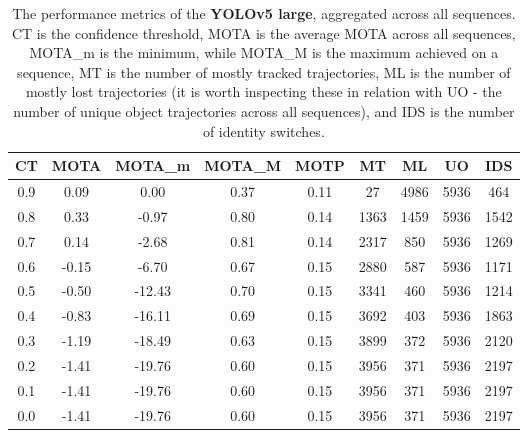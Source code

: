 \begin{table}[h]
    \centering
    \begin{tabular}{|c||c|c|c|c|c|c|c|c|}
        \hline
        CT & MOTA & MOTA\_m & MOTA\_M & MOTP & MT & ML & UO & IDS \\
        \hline
        \hline
        0.9 & 0.09 & 0.00 & 0.37 & 0.11 & 27 & 4986 & 5936 & 464 \\
        \hline
        0.8 & 0.33 & -0.97 & 0.80 & 0.14 & 1363 & 1459 & 5936 & 1542 \\
        \hline
        0.7 & 0.14 & -2.68 & 0.81 & 0.14 & 2317 & 850 & 5936 & 1269 \\
        \hline
        0.6 & -0.15 & -6.70 & 0.67 & 0.15 & 2880 & 587 & 5936 & 1171 \\
        \hline
        0.5 & -0.50 & -12.43 & 0.70 & 0.15 & 3341 & 460 & 5936 & 1214 \\
        \hline
        0.4 & -0.83 & -16.11 & 0.69 & 0.15 & 3692 & 403 & 5936 & 1863 \\
        \hline
        0.3 & -1.19 & -18.49 & 0.63 & 0.15 & 3899 & 372 & 5936 & 2120 \\
        \hline
        0.2 & -1.41 & -19.76 & 0.60 & 0.15 & 3956 & 371 & 5936 & 2197 \\
        \hline
        0.1 & -1.41 & -19.76 & 0.60 & 0.15 & 3956 & 371 & 5936 & 2197 \\
        \hline
        0.0 & -1.41 & -19.76 & 0.60 & 0.15 & 3956 & 371 & 5936 & 2197 \\
        \hline
    \end{tabular}
    \caption{The performance metrics of the \textbf{YOLOv5 large}, aggregated across all sequences. CT is the confidence threshold, MOTA is the average MOTA across all sequences, MOTA\_m is the minimum, while MOTA\_M is the maximum achieved on a sequence, MT is the number of mostly tracked trajectories, ML is the number of mostly lost trajectories (it is worth inspecting these in relation with UO - the number of unique object trajectories across all sequences), and IDS is the number of identity switches.}
    \label{tab:mota_yl}
\end{table}
